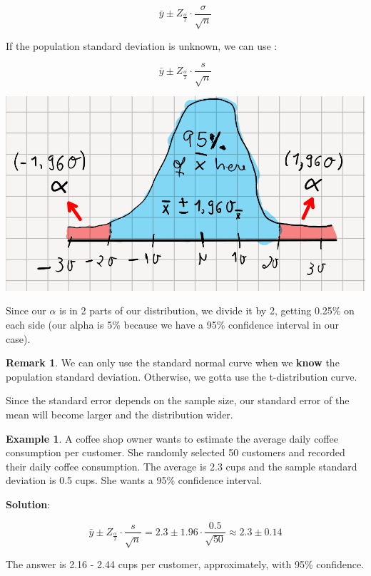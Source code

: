 \documentclass[12pt]{book}
\theoremstyle{definition}
\newtheorem{exmp}{Example}[section]
\newtheorem{remark}{Remark}[section]
\begin{document}
\begin{equation}
    \bar{y} \pm Z_{\frac{\alpha}{2}} \cdot \frac{\sigma}{\sqrt{n}}
\end{equation}

If the population standard deviation is unknown, we can use :

\begin{equation}
    \bar{y} \pm Z_{\frac{\alpha}{2}} \cdot \frac{s}{\sqrt{n}}
\end{equation}

\begin{center}
    \includegraphics[scale=0.4]{./assets/confidence.png}
\end{center}

Since our $\alpha$ is in 2 parts of our distribution, we divide it by 2, getting 0.25\% on each side (our alpha is 5\% because we have a 95\% confidence interval in our case).

\begin{remark}
    We can only use the standard normal curve when we \textbf{know} the population standard deviation. Otherwise, we gotta use the t-distribution curve.
\end{remark}

Since the standard error depends on the sample size, our standard error of the mean will become larger and the distribution wider.

\begin{exmp}
    A coffee shop owner wants to estimate the average daily coffee consumption per customer. She randomly selected 50 customers and recorded their daily coffee consumption. The average is 2.3 cups and the sample standard deviation is 0.5 cups. She wants a 95\% confidence interval.

    \textbf{Solution}:

     \begin{equation}
       \bar{y} \pm Z_{\frac{\alpha}{2}} \cdot \frac{s}{\sqrt{n}} = 2.3 \pm 1.96 \cdot \frac{0.5}{\sqrt{50}} \approx 2.3 \pm 0.14
     \end{equation}

     The answer is 2.16 - 2.44 cups per customer, approximately, with 95\% confidence.
\end{exmp}
\end{document}
